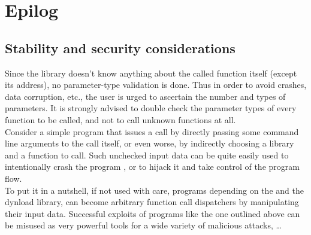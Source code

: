 %
%
%
%

\newpage

\section{Epilog}

\subsection{Stability and security considerations}

Since the  library doesn't know anything about the called function itself
(except its address), no parameter-type validation is done. Thus in order to avoid crashes, data corruption, etc., the user is urged to ascertain the number and types of parameters. 
It is strongly advised to double check the parameter types of every function to be called, and not to call unknown functions at all.\\

Consider a simple program that issues a call by directly passing some command line arguments to the call itself, or even worse, by indirectly choosing a library and a function to call. Such unchecked input data can be quite easily used to intentionally crash the program , or to hijack it and take control of the program flow.\\
To put it in a nutshell, if not used with care, programs depending on the 
and the dynload library, can become arbitrary function call dispatchers by
manipulating their input data. Successful exploits of programs like the one
outlined above can be misused as very powerful tools for a wide variety of
malicious attacks, \ldots
 

